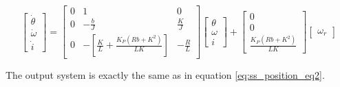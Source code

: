 \documentclass[a4paper, 12pt]{article}
\begin{document}
\begin{equation}
  \left[
  \begin{array}{c}
    \dot \theta \\
    \dot \omega \\
    \dot i
  \end{array}
  \right]
  =
  \left[
  \begin{array}{ccc}
    0 & 1 & 0 \\
    0 & -\frac{b}{J} & \frac{K}{J} \\
    0 & -\left[ \frac{K}{L} + \frac{K_P(Rb + K^2)}{LK} \right] & -\frac{R}{L}
  \end{array}
  \right]
  \left[
  \begin{array}{c}
    \theta \\
    \omega \\
    i
  \end{array}
  \right]
  +
  \left[
  \begin{array}{c}
    0 \\
    0 \\
    \frac{K_P(Rb + K^2)}{LK}
  \end{array}
  \right]
  \left[
  \begin{array}{c}
    \omega_r
  \end{array}
  \right]
  \label{eq:3_ss_position}
\end{equation}

The output system is exactly the same as in equation \eqref{eq:ss_position_eq2}.
\end{document}
